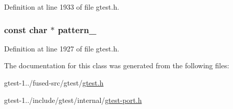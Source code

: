 \-Definition at line 1933 of file gtest.\-h.

\hypertarget{classtesting_1_1internal_1_1RE_a7e6314164db9144f9414dc985d07b185}{
\subsubsection[{pattern\-\_\-}]{\setlength{\rightskip}{0pt plus 5cm}const char $\ast$ {\bf pattern\-\_\-}}}\label{d0/d6d/classtesting_1_1internal_1_1RE_a7e6314164db9144f9414dc985d07b185}


\-Definition at line 1927 of file gtest.\-h.



\-The documentation for this class was generated from the following files\-:\begin{DoxyCompactItemize}
\item 
gtest-\/1../fused-\/src/gtest/\hyperlink{fused-src_2gtest_2gtest_8h}{gtest.\-h}\item 
gtest-\/1../include/gtest/internal/\hyperlink{gtest-port_8h}{gtest-\/port.\-h}\end{DoxyCompactItemize}
